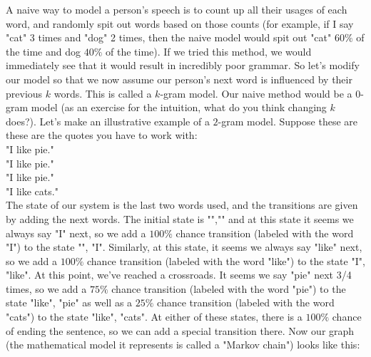 \documentclass[12pt]{article}
\begin{document}
A naive way to model a person's speech is to count up all their usages of each word, and randomly spit out words based on those counts (for example, if I say "cat" 3 times and "dog" 2 times, then the naive model would spit out "cat" $60\%$ of the time and dog $40\%$ of the time). If we tried this method, we would immediately see that it would result in incredibly poor grammar. So let's modify our model so that we now assume our person's next word is influenced by their previous $k$ words. This is called a $k$-gram model. Our naive method would be a $0$-gram model (as an exercise for the intuition, what do you think changing $k$ does?). Let's make an illustrative example of a $2$-gram model. Suppose these are these are the quotes you have to work with: \\
"I like pie." \\
"I like pie." \\
"I like pie." \\
"I like cats." \\
The state of our system is the last two words used, and the transitions are given by adding the next words. The initial state is "","" and at this state it seems we always say "I" next, so we add a $100\%$ chance transition (labeled with the word "I") to the state "", "I". Similarly, at this state, it seems we always say "like" next, so we add a $100\%$ chance transition (labeled with the word "like") to the state "I", "like". At this point, we've reached a crossroads. It seems we say "pie" next 3/4 times, so we add a  $75\%$ chance transition (labeled with the word "pie") to the state "like", "pie" as well as a $25\%$ chance transition (labeled with the word "cats") to the state "like", "cats". At either of these states, there is a $100\%$ chance of ending the sentence, so we can add a special transition there. Now our graph (the mathematical model it represents is called a "Markov chain") looks like this: \\

\end{document}
